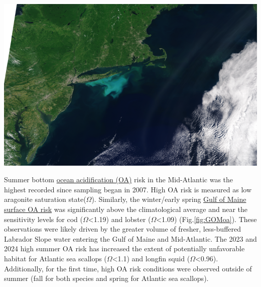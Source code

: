 \documentclass[
  10pt,
]{article}
\let\origfigure\figure
\let\endorigfigure\endfigure
\renewenvironment{figure}[1][2] {
    \expandafter\origfigure\expandafter[H]
} {
    \endorigfigure
}
\begin{document}
\begin{figure}

{\centering \includegraphics[width=0.65\linewidth]{SOE-NEFMC_files/figure-latex/cocobloom-1} 

}

\caption{An OLCI Sentinel 3A true color image with enhanced contrast captured on July 2, 2024. Coccolithophores shed their coccolith plates during the later stages of the bloom cycle, which results in the milky turquoise water color (Image credit: NOAA STAR, OCView and Ocean Color Science Team).}\label{fig:cocobloom}
\end{figure}

Summer bottom \href{https://noaa-edab.github.io/catalog/ocean_acidification.html}{ocean acidification (OA)} risk in the Mid-Atlantic was the highest recorded since sampling began in 2007. High OA risk is measured as low aragonite saturation state(\(\Omega\)). Similarly, the winter/early spring \href{https://noaa-edab.github.io/catalog/gom_acidification.html}{Gulf of Maine surface OA risk} was significantly above the climatological average and near the sensitivity levels for cod (\(\Omega\)\textless1.19) and lobster (\(\Omega\)\textless1.09) (Fig.\ref{fig:GOMoa}). These observations were likely driven by the greater volume of fresher, less-buffered Labrador Slope water entering the Gulf of Maine and Mid-Atlantic. The 2023 and 2024 high summer OA risk has increased the extent of potentially unfavorable habitat for Atlantic sea scallops (\(\Omega\)\textless1.1) and longfin squid (\(\Omega\)\textless0.96). Additionally, for the first time, high OA risk conditions were observed outside of summer (fall for both species and spring for Atlantic sea scallops).
\end{document}
